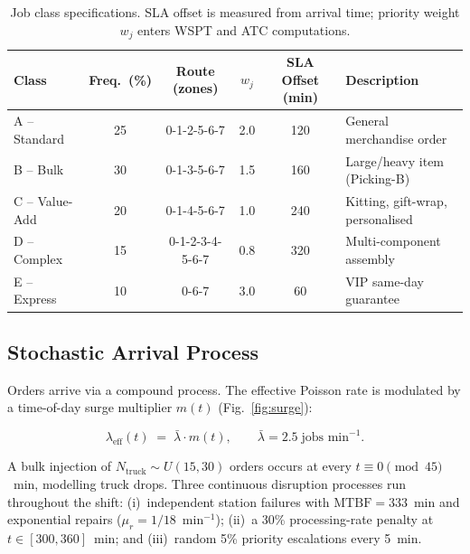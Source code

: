 \documentclass[3p,times]{elsarticle}
\begin{document}
\begin{table}[htbp]
  \centering
  \caption{Job class specifications.  SLA offset is measured from
    arrival time; priority weight $w_{j}$ enters WSPT and ATC
    computations.}
  \label{tab:jobclasses}
  \begin{tabular}{@{}lccccl@{}}
    \toprule
    Class & Freq.\ (\%) & Route (zones) & $w_{j}$ &
      SLA Offset (min) & Description \\
    \midrule
    A -- Standard & 25 & 0-1-2-5-6-7     & 2.0 & 120 &
      General merchandise order \\
    B -- Bulk     & 30 & 0-1-3-5-6-7     & 1.5 & 160 &
      Large/heavy item (Picking-B) \\
    C -- Value-Add& 20 & 0-1-4-5-6-7     & 1.0 & 240 &
      Kitting, gift-wrap, personalised \\
    D -- Complex  & 15 & 0-1-2-3-4-5-6-7 & 0.8 & 320 &
      Multi-component assembly \\
    E -- Express  & 10 & 0-6-7           & 3.0 &  60 &
      VIP same-day guarantee \\
    \bottomrule
  \end{tabular}
\end{table}

\subsection{Stochastic Arrival Process}
\label{sec:arrivals}

Orders arrive via a compound process.  The effective Poisson rate
is modulated by a time-of-day surge multiplier $m(t)$
(Fig.~\ref{fig:surge}):

\begin{equation}
  \lambda_{\text{eff}}(t) \;=\; \bar{\lambda} \cdot m(t),
  \qquad \bar{\lambda} = 2.5\;\text{jobs min}^{-1}.
  \label{eq:lambda}
\end{equation}

A bulk injection of $N_{\text{truck}} \sim U(15,30)$ orders occurs
at every $t \equiv 0 \pmod{45}$~min, modelling truck drops.
Three continuous disruption processes run throughout the shift:
(i)~independent station failures with $\text{MTBF}=333$~min and
exponential repairs ($\mu_{r}=1/18$~min$^{-1}$);
(ii)~a 30\% processing-rate penalty at $t\in[300,360]$~min; and
(iii)~random 5\% priority escalations every 5~min.
\end{document}
